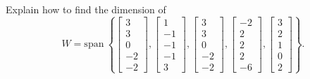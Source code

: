 \documentclass{article}
\begin{document}
\begin{exerciseStatement}
    Explain how to find the dimension of
\[W=\mathrm{span}\ \left\{\left[\begin{array}{r}
3 \\
3 \\
0 \\
-2 \\
-2
\end{array}\right] , \left[\begin{array}{r}
1 \\
-1 \\
-1 \\
-1 \\
3
\end{array}\right] , \left[\begin{array}{r}
3 \\
3 \\
0 \\
-2 \\
-2
\end{array}\right] , \left[\begin{array}{r}
-2 \\
2 \\
2 \\
2 \\
-6
\end{array}\right] , \left[\begin{array}{r}
3 \\
2 \\
1 \\
0 \\
2
\end{array}\right]\right\}.\]



  
\end{exerciseStatement}
\end{document}
